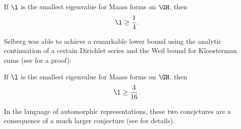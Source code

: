     \begin{conjecture}
      If $\l$ is the smallest eigenvalue for Maass forms on $\GH$, then
      \[
        \l \ge \frac{1}{4}.
      \]
    \end{conjecture}

    Selberg was able to achieve a remarkable lower bound using the analytic continuation of a certain Dirichlet series and the Weil bound for Kloosterman sums (see \cite{iwaniec2002spectral} for a proof):

    \begin{theorem}
      If $\l$ is the smallest eigenvalue for Maass forms on $\GH$, then
      \[
        \l \ge \frac{3}{16}.
      \]
    \end{theorem}

    In the language of automorphic representations, these two conejctures are a consequence of a much larger conjecture (see \cite{blomer2013role} for details).